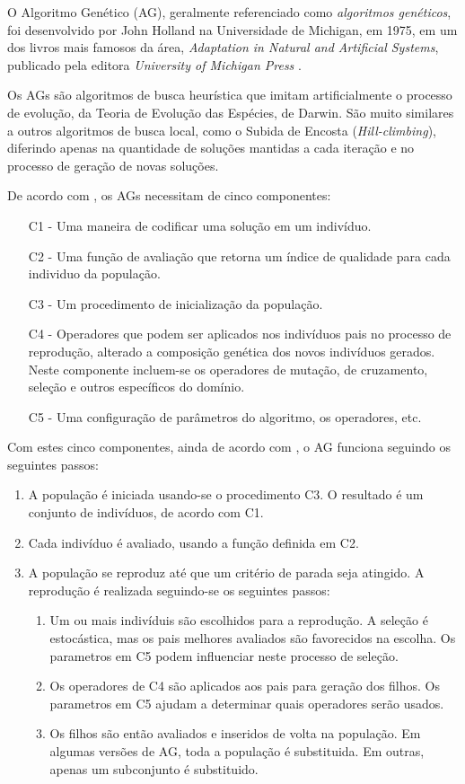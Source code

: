 \documentclass[12pt]{article}
\begin{document}
\par O Algoritmo Genético (AG), geralmente referenciado como \emph{algoritmos genéticos}, foi desenvolvido por John Holland na Universidade de Michigan, em 1975, em um dos livros mais famosos da área, \emph{Adaptation in Natural and Artificial Systems}, publicado pela editora \emph{University of Michigan Press} \cite{essentials:pop}.
\par Os AGs são algoritmos de busca heurística que imitam artificialmente o processo de evolução, da Teoria de Evolução das Espécies, de Darwin. São muito similares a outros algoritmos de busca local, como o Subida de Encosta (\textit{Hill-climbing}), diferindo apenas na quantidade de soluções mantidas a cada iteração e no processo de geração de novas soluções.
\par De acordo com \cite{montana}, os AGs necessitam de cinco componentes:
\begin{enumerate}
\item[C1] - Uma maneira de codificar uma solução em um indivíduo.
\item[C2] - Uma função de avaliação que retorna um índice de qualidade para cada individuo da população.
\item[C3] - Um procedimento de inicialização da população.
\item[C4] - Operadores que podem ser aplicados nos indivíduos pais no processo de reprodução, alterado a composição genética dos novos indivíduos gerados. Neste componente incluem-se os operadores de mutação, de cruzamento, seleção e outros específicos do domínio.
\item[C5] - Uma configuração de parâmetros do algoritmo, os operadores, etc.
\end{enumerate}
Com estes cinco componentes, ainda de acordo com \cite{montana}, o AG funciona seguindo os seguintes passos:
\begin{enumerate}
	\item A população é iniciada usando-se o procedimento C3. O resultado é um conjunto de indivíduos, de acordo com C1.
	\item Cada indivíduo é avaliado, usando a função definida em C2.
	\item A população se reproduz até que um critério de parada seja atingido. A reprodução é realizada seguindo-se os seguintes passos:
	 \begin{enumerate}
		\item Um ou mais indivíduis são escolhidos para a reprodução. A seleção é estocástica, mas os pais melhores avaliados são favorecidos na escolha. Os parametros em C5 podem influenciar neste processo de seleção.
		\item Os operadores de C4 são aplicados aos pais para geração dos filhos. Os parametros em C5 ajudam a determinar quais operadores serão usados.
		\item Os filhos são então avaliados e inseridos de volta na população. Em algumas versões de AG, toda a população é substituida. Em outras, apenas um subconjunto é substituido.		
	\end{enumerate}
\end{enumerate}
\end{document}
